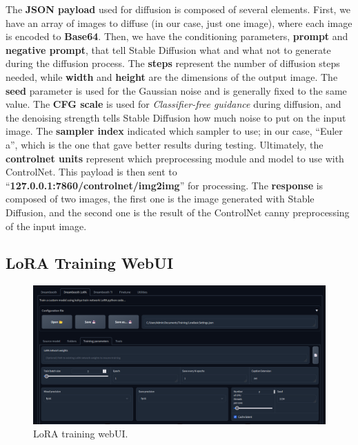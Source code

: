 \documentclass[preprint]{elsarticle}
\begin{document}
The \textbf{JSON payload} used for diffusion is composed of several elements.
First, we have an array of images to diffuse (in our case, just one image), 
where each image is encoded to \textbf{Base64}. 
Then, we have the conditioning parameters, \textbf{prompt} and \textbf{negative prompt}, 
that tell Stable Diffusion what and what not to generate during the diffusion process. 
The \textbf{steps} represent the number of diffusion steps needed, while \textbf{width} 
and \textbf{height} are the dimensions of the output image. 
The \textbf{seed} parameter is used for the Gaussian noise and is generally fixed to the same value. 
The \textbf{CFG scale} is used for \emph{Classifier-free guidance} during diffusion, 
and the denoising strength tells Stable Diffusion how much noise to put on the input image. 
The \textbf{sampler index} indicated which sampler to use; in our case, ``Euler a'', 
which is the one that gave better results during testing.
Ultimately, the \textbf{controlnet units} represent which preprocessing module and model to use with ControlNet.
This payload is then sent to ``\textbf{127.0.0.1:7860/controlnet/img2img}'' for processing. 
The \textbf{response} is composed of two images, the first one is the image generated with Stable Diffusion, 
and the second one is the result of the ControlNet canny preprocessing of the input image.

\subsection{LoRA Training WebUI} \label{sec:lora_training_webui}

\begin{figure}[H]
	\centering
	\includegraphics[width=15cm, keepaspectratio]{img/project_img/lora.png} 
	\caption{LoRA training webUI.}
	\label{fig:lora-webui}
\end{figure}
\end{document}
